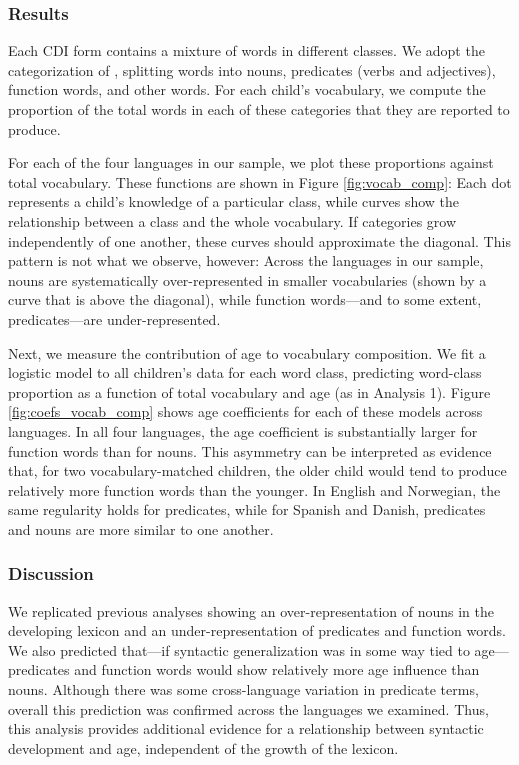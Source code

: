 \documentclass[10pt,letterpaper]{article}
\begin{document}
\subsubsection{Results}

Each CDI form contains a mixture of words in different classes. We adopt the categorization of , splitting words into nouns, predicates (verbs and adjectives), function words, and other words. For each child's vocabulary, we compute the proportion of the total words in each of these categories that they are reported to produce.

For each of the four languages in our sample, we plot these proportions against total vocabulary. These functions are shown in Figure \ref{fig:vocab_comp}: Each dot represents a child's knowledge of a particular class, while curves show the relationship between a class and the whole vocabulary. If categories grow independently of one another, these curves should approximate the diagonal. This pattern is not what we observe, however: Across the languages in our sample, nouns are systematically over-represented in smaller vocabularies (shown by a curve that is above the diagonal), while function words---and to some extent, predicates---are under-represented. 

Next, we measure the contribution of age to vocabulary composition. We fit a logistic model to all children's data for each word class, predicting word-class proportion as a function of total vocabulary and age (as in Analysis 1). Figure \ref{fig:coefs_vocab_comp} shows age coefficients for each of these models across languages. In all four languages, the age coefficient is substantially larger for function words than for nouns. This asymmetry can be interpreted as evidence that, for two vocabulary-matched children, the older child would tend to produce relatively more function words than the younger. In English and Norwegian, the same regularity holds for predicates, while for Spanish and Danish, predicates and nouns are more similar to one another.

\subsubsection{Discussion}

We replicated previous analyses \cite{bates1994} showing an over-representation of nouns in the developing lexicon and an under-representation of predicates and function words. We also predicted that---if syntactic generalization was in some way tied to age---predicates and function words would show relatively more age influence than nouns. Although there was some cross-language variation in predicate terms, overall this prediction was confirmed across the languages we examined. Thus, this analysis provides additional evidence for a relationship between syntactic development and age, independent of the growth of the lexicon.
\end{document}
